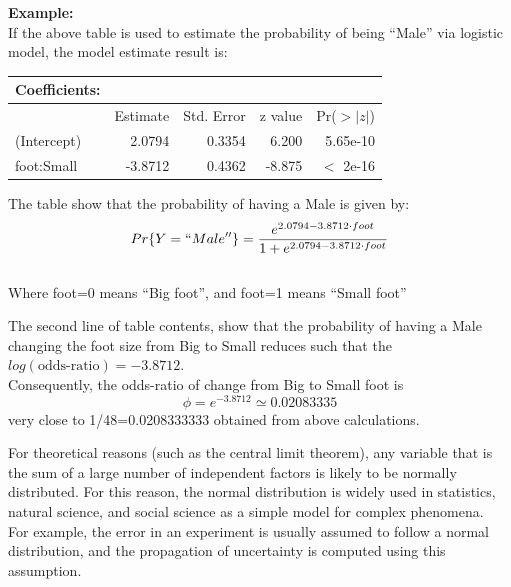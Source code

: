 \begin{frame}
  \vspace{.25cm}
  \textbf{Example:}\\
  \vspace{.25cm}
  If the above table is used to estimate the probability of being ``Male'' via logistic model, the model estimate result is:\\
  \begin{center}
    \begin{tabular}{lrrrr}
      Coefficients: &&&&\\
      \hline
      & Estimate & Std. Error &z value & Pr($>|z|$) \\
      \hline
      (Intercept)  & 2.0794  &  0.3354  & 6.200 & 5.65e-10 \\
      foot:Small  & -3.8712   & 0.4362  & -8.875  & $<$ 2e-16 \\
      \hline
    \end{tabular}
  \end{center}
  The table show that the probability of having a Male is given by:
  $$Pr\{Y=``Male''\}=\dfrac{e^{2.0794-3.8712 \cdot foot}}{1+e^{2.0794-3.8712 \cdot foot}}$$\\
  Where foot=0 means ``Big foot'', and foot=1 means ``Small foot''
\end{frame}

\begin{frame}
  \vspace{.25cm}
  The second line of table contents, show that the probability of having a Male changing the foot size from Big to Small reduces such that the $log(\text{odds-ratio})=-3.8712$.\\
  \vspace{1cm}
  Consequently, the odds-ratio of change from Big to Small foot is\\
  $$\phi=e^{-3.8712}\simeq 0.02083335$$
  \vspace{.5cm}
  very close to 1/48=0.0208333333 obtained from above calculations.
\end{frame}





\begin{frame}
  \vspace{.25cm}
  For theoretical reasons (such as the central limit theorem), any variable that is the sum of a large number of independent factors is likely to be normally distributed. For this reason, the normal distribution is widely used in statistics, natural science, and social science as a simple model for complex phenomena. \\
  \vspace{.75cm}
  For example, the error in an experiment is usually assumed to follow a normal distribution, and the propagation of uncertainty is computed using this assumption.
\end{frame}

